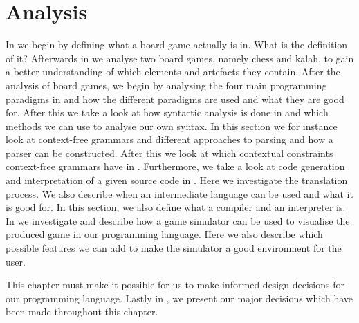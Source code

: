\chapter{Analysis}
\label{chap:analysis}

In  we begin by defining what a board game
actually is in.  What is the definition of it? Afterwards in
 we analyse two board games, namely chess and kalah,
to gain a better understanding of which elements and artefacts they contain.
After the analysis of board games, we begin by analysing the four main
programming paradigms in  and how the different paradigms
are used and what they are good for. After this we take a look at how syntactic
analysis is done in  and which methods we can use
to analyse our own syntax. In this section we for instance look at context-free
grammars and different approaches to parsing and how a parser can be
constructed. After this we look at which contextual constraints context-free
grammars have in . Furthermore, we take a look
at code generation and interpretation of a given source code in
. Here we investigate the
translation process. We also describe when an intermediate language can be used
and what it is good for. In this section, we also define what a compiler and an
interpreter is. In  we investigate and describe how a game
simulator can be used to visualise the produced game in our programming
language. Here we also describe which possible features we can add to make the
simulator a good environment for the user. 

This chapter must make it possible for us to make informed design decisions for
our programming language. Lastly in , we present
our major decisions which have been made throughout this chapter.










